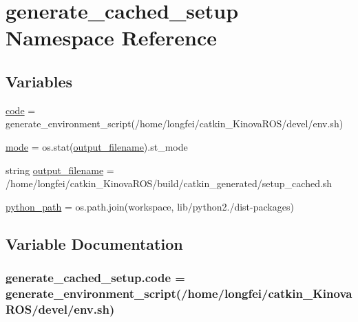 \hypertarget{namespacegenerate__cached__setup}{}\section{generate\+\_\+cached\+\_\+setup Namespace Reference}
\label{namespacegenerate__cached__setup}
\subsection*{Variables}
\begin{DoxyCompactItemize}
\item 
\hyperlink{namespacegenerate__cached__setup_a52601295006f2366a311c4453d8f2f2e}{code} = generate\+\_\+environment\+\_\+script(\textquotesingle{}/home/longfei/catkin\+\_\+\+Kinova\+R\+OS/devel/env.\+sh\textquotesingle{})
\item 
\hyperlink{namespacegenerate__cached__setup_a10081e5abedae9bd46dd91202096e789}{mode} = os.\+stat(\hyperlink{namespacegenerate__cached__setup_a0265aee5075ee1eb701ff69c98ad6793}{output\+\_\+filename}).st\+\_\+mode
\item 
string \hyperlink{namespacegenerate__cached__setup_a0265aee5075ee1eb701ff69c98ad6793}{output\+\_\+filename} = \textquotesingle{}/home/longfei/catkin\+\_\+\+Kinova\+R\+OS/build/catkin\+\_\+generated/setup\+\_\+cached.\+sh\textquotesingle{}
\item 
\hyperlink{namespacegenerate__cached__setup_a72579fd01529a79bab20d99291889d3f}{python\+\_\+path} = os.\+path.\+join(workspace, \textquotesingle{}lib/python2./dist-\/packages\textquotesingle{})
\end{DoxyCompactItemize}


\subsection{Variable Documentation}
\subsubsection[{\texorpdfstring{code}{code}}]{\setlength{\rightskip}{0pt plus 5cm}generate\+\_\+cached\+\_\+setup.\+code = generate\+\_\+environment\+\_\+script(\textquotesingle{}/home/longfei/catkin\+\_\+\+Kinova\+R\+OS/devel/env.\+sh\textquotesingle{})}\hypertarget{namespacegenerate__cached__setup_a52601295006f2366a311c4453d8f2f2e}{}\label{namespacegenerate__cached__setup_a52601295006f2366a311c4453d8f2f2e}

